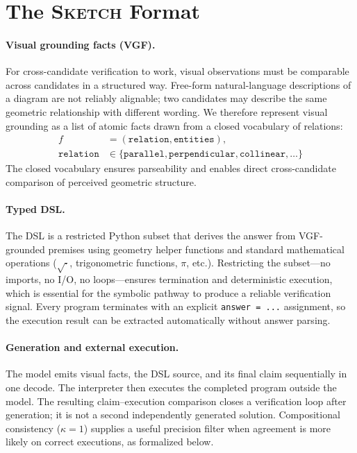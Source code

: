 \documentclass{article}
\newcommand{\sketch}{\textsc{Sketch}}
\begin{document}
\section{The \sketch{} Format}
\label{sec:format}

\paragraph{Visual grounding facts (VGF).}
For cross-candidate verification to work, visual observations must be comparable across candidates in a structured way. Free-form natural-language descriptions of a diagram are not reliably alignable; two candidates may describe the same geometric relationship with different wording. We therefore represent visual grounding as a list of atomic facts drawn from a closed vocabulary of relations:
\begin{equation}
    \begin{aligned}
    f &= (\texttt{relation}, \texttt{entities}), \\
    \texttt{relation} &\in \{\texttt{parallel}, \texttt{perpendicular}, \texttt{collinear}, \ldots\}
    \end{aligned}
    \label{eq:vgf}
\end{equation}
The closed vocabulary ensures parseability and enables direct cross-candidate comparison of perceived geometric structure.

\paragraph{Typed DSL.}
The DSL is a restricted Python subset that derives the answer from VGF-grounded premises using geometry helper functions and standard mathematical operations ($\sqrt{\cdot}$, trigonometric functions, $\pi$, etc.). Restricting the subset---no imports, no I/O, no loops---ensures termination and deterministic execution, which is essential for the symbolic pathway to produce a reliable verification signal. Every program terminates with an explicit \texttt{answer = ...} assignment, so the execution result can be extracted automatically without answer parsing.

\paragraph{Generation and external execution.}
The model emits visual facts, the DSL source, and its final claim sequentially in one decode. The interpreter then executes the completed program outside the model. The resulting claim--execution comparison closes a verification loop after generation; it is not a second independently generated solution. Compositional consistency ($\kappa=1$) supplies a useful precision filter when agreement is more likely on correct executions, as formalized below.
\end{document}

